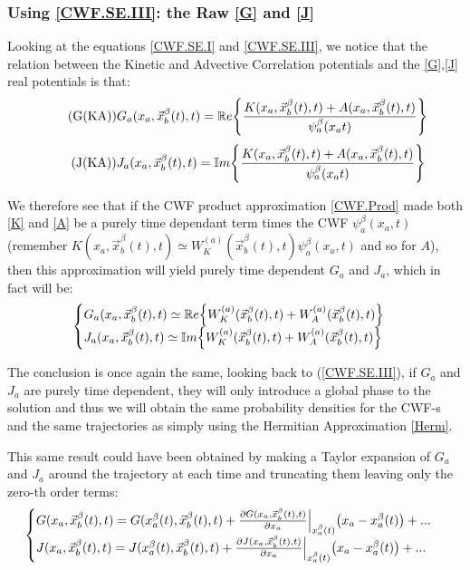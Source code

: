 \documentclass[11pt, a4paper]{article} %
\newcommand{\R}{\mathbb{R}} %
\begin{document}
\subsubsection{Using \ref{CWF.SE.III}: the Raw \ref{G} and \ref{J}}
Looking at the equations \ref{CWF.SE.I} and \ref{CWF.SE.III}, we notice that the relation between the Kinetic and Advective Correlation potentials and the \ref{G},\ref{J} real potentials is that:
\begin{equation}\label{G(KA)}\tag{G(KA)}
G_a(x_a,\vec{x}_b^\beta(t), t) = \mathbb{R}e\qty{\frac{K(x_a, \vec{x}_b^\beta(t), t)+A(x_a, \vec{x}_b^\beta(t), t)}{\psi_a^\beta(x_a t)}}
\end{equation}
\begin{equation}\label{J(KA)}\tag{J(KA)}
J_a(x_a,\vec{x}_b^\beta(t), t) = \mathbb{I}m\qty{\frac{K(x_a, \vec{x}_b^\beta(t), t)+A(x_a, \vec{x}_b^\beta(t), t)}{\psi_a^\beta(x_a t)}}
\end{equation}

We therefore see that if the CWF product approximation \ref{CWF.Prod} made both \ref{K} and \ref{A} be a purely time dependant term times the CWF $\psi_a^\beta(x_a,t)$ (remember $K(x_a, \vec{x}_b^\beta(t), t) \simeq W^{(a)}_K(\vec{x}_b^\beta (t),t)\psi_a^\beta(x_a,t)$ and so for $A$), then this approximation will yield purely time dependent $G_a$ and $J_a$, which in fact will be:
$$\begin{cases}
G_a(x_a,\vec{x}_b^\beta(t), t)\simeq \R e\qty{W^{(a)}_K(\vec{x}_b^\beta (t),t) + W^{(a)}_A(\vec{x}_b^\beta (t),t)}\\ J_a(x_a,\vec{x}_b^\beta(t), t)\simeq \mathbb{I} m\qty{W^{(a)}_K(\vec{x}_b^\beta (t),t) + W^{(a)}_A(\vec{x}_b^\beta (t),t)} \end{cases}
$$

The conclusion is once again the same, looking back to (\ref{CWF.SE.III}), if $G_a$ and $J_a$ are purely time dependent, they will only introduce a global phase to the solution and thus we will obtain the same probability densities for the CWF-s and the same trajectories as simply using the Hermitian Approximation \ref{Herm}.

This same result could have been obtained by making a Taylor expansion of $G_a$ and $J_a$ around the trajectory at each time and truncating them leaving only the zero-th order terms:
$$\begin{cases}
G(x_a, \vec{x}_b^\beta(t), t) = G(x_a^\beta(t), \vec{x}_b^\beta(t), t) + \pdv{G(x_a, \vec{x}_b^\beta(t), t)}{x_a}\Big\rvert_{x_a^\beta(t)} \qty(x_a-x_a^\beta(t))+ ... \\
J(x_a, \vec{x}_b^\beta(t), t) = J(x_a^\beta(t), \vec{x}_b^\beta(t), t) + \pdv{J(x_a, \vec{x}_b^\beta(t), t)}{x_a}\Big\rvert_{x_a^\beta(t)} \qty(x_a-x_a^\beta(t))+ ... 
\end{cases}
$$ 
\newpage
\end{document}
